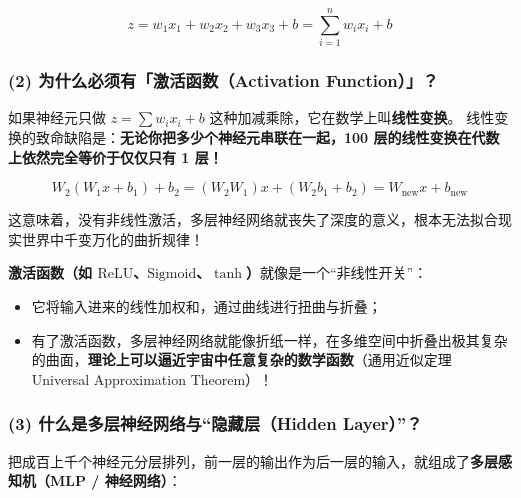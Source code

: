 \[
z = w_1 x_1 + w_2 x_2 + w_3 x_3 + b = \sum_{i=1}^n w_i x_i + b
\]

\subsubsection{(2) 为什么必须有「激活函数（Activation Function）」？}

如果神经元只做 $z = \sum w_i x_i + b$ 这种加减乘除，它在数学上叫\textbf{线性变换}。
线性变换的致命缺陷是：\textbf{无论你把多少个神经元串联在一起，100 层的线性变换在代数上依然完全等价于仅仅只有 1 层！}

\[
W_2(W_1 x + b_1) + b_2 = (W_2 W_1) x + (W_2 b_1 + b_2) = W_{\text{new}} x + b_{\text{new}}
\]

这意味着，没有非线性激活，多层神经网络就丧失了深度的意义，根本无法拟合现实世界中千变万化的曲折规律！

\textbf{激活函数（如 $\text{ReLU}$、$\text{Sigmoid}$、$\tanh$）}就像是一个“非线性开关”：
\begin{itemize}
  \item 它将输入进来的线性加权和，通过曲线进行扭曲与折叠；
  \item 有了激活函数，多层神经网络就能像折纸一样，在多维空间中折叠出极其复杂的曲面，\textbf{理论上可以逼近宇宙中任意复杂的数学函数}（通用近似定理 Universal Approximation Theorem）！
\end{itemize}

\subsubsection{(3) 什么是多层神经网络与“隐藏层（Hidden Layer）”？}

把成百上千个神经元分层排列，前一层的输出作为后一层的输入，就组成了\textbf{多层感知机（MLP / 神经网络）}：

